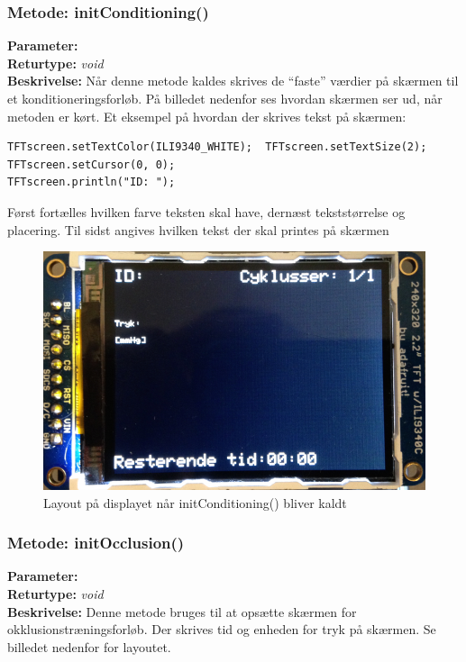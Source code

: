 \subsubsection{Metode: initConditioning()}
\textbf{Parameter: }
\\ \textbf{Returtype: } \textit{void}
\\ \textbf{Beskrivelse: } Når denne metode kaldes skrives de “faste” værdier på skærmen til et konditioneringsforløb. På billedet nedenfor ses hvordan skærmen ser ud, når metoden er kørt. Et eksempel på hvordan der skrives tekst på skærmen: 
\begin{lstlisting}
TFTscreen.setTextColor(ILI9340_WHITE);  TFTscreen.setTextSize(2);
TFTscreen.setCursor(0, 0);
TFTscreen.println("ID: ");
\end{lstlisting}
Først fortælles hvilken farve teksten skal have, dernæst tekststørrelse og placering. Til sidst angives hvilken tekst der skal printes på skærmen

\begin{figure}[H]
	\includegraphics[width=\textwidth]{billeder/conditioning.png}
	\caption{Layout på displayet når initConditioning() bliver kaldt}\label{pic:conditiong}
\end{figure}

\subsubsection{Metode: initOcclusion()}
\textbf{Parameter: }
\\ \textbf{Returtype: } \textit{void}
\\ \textbf{Beskrivelse: }  Denne metode bruges til at opsætte skærmen for okklusionstræningsforløb. Der skrives tid og enheden for tryk på skærmen. Se billedet nedenfor for layoutet. 

